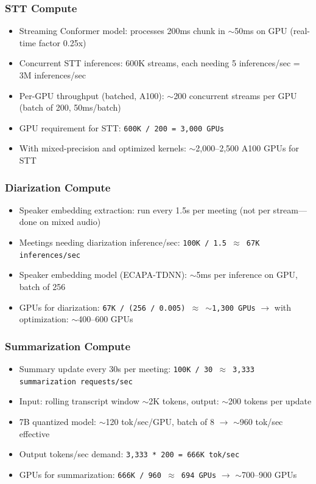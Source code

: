 \subsubsection*{STT Compute}

\begin{itemize}
  \item Streaming Conformer model: processes 200ms chunk in $\sim$50ms on GPU (real-time factor 0.25x)
  \item Concurrent STT inferences: 600K streams, each needing 5 inferences/sec = 3M inferences/sec
  \item Per-GPU throughput (batched, A100): $\sim$200 concurrent streams per GPU (batch of 200, 50ms/batch)
  \item GPU requirement for STT: \texttt{600K / 200 = 3,000 GPUs}
  \item With mixed-precision and optimized kernels: $\sim$2,000--2,500 A100 GPUs for STT
\end{itemize}

\subsubsection*{Diarization Compute}

\begin{itemize}
  \item Speaker embedding extraction: run every 1.5s per meeting (not per stream---done on mixed audio)
  \item Meetings needing diarization inference/sec: \texttt{100K / 1.5 $\approx$ 67K inferences/sec}
  \item Speaker embedding model (ECAPA-TDNN): $\sim$5ms per inference on GPU, batch of 256
  \item GPUs for diarization: \texttt{67K / (256 / 0.005) $\approx$ $\sim$1,300 GPUs} $\rightarrow$ with optimization: $\sim$400--600 GPUs
\end{itemize}

\subsubsection*{Summarization Compute}

\begin{itemize}
  \item Summary update every 30s per meeting: \texttt{100K / 30 $\approx$ 3,333 summarization requests/sec}
  \item Input: rolling transcript window $\sim$2K tokens, output: $\sim$200 tokens per update
  \item 7B quantized model: $\sim$120 tok/sec/GPU, batch of 8 $\rightarrow$ $\sim$960 tok/sec effective
  \item Output tokens/sec demand: \texttt{3,333 * 200 = 666K tok/sec}
  \item GPUs for summarization: \texttt{666K / 960 $\approx$ 694 GPUs} $\rightarrow$ $\sim$700--900 GPUs
\end{itemize}

